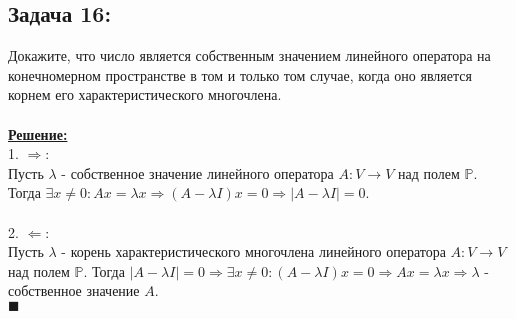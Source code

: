 \documentclass[a4paper,12pt,titlepage,final]{article}
\begin{document}
\subsection*{Задача 16:}
\noindent Докажите, что число является собственным значением линейного оператора на конечномерном
пространстве в том и только том случае, когда оно является корнем его характеристического
многочлена. \\ \\
\textbf{\underline{Решение:}} \\
1. $\Rightarrow:$ \\
Пусть $\lambda$ - собственное значение линейного оператора $A: V \rightarrow V$ над полем $\mathbb{P}$.
Тогда $\exists x \neq 0: Ax = \lambda x \Rightarrow (A - \lambda I)x = 0 \Rightarrow |A - \lambda I| = 0$. \\ \\
2. $\Leftarrow:$ \\
Пусть $\lambda$ - корень характеристического многочлена линейного оператора $A: V \rightarrow V$ над полем $\mathbb{P}$.
Тогда $|A - \lambda I| = 0 \Rightarrow \exists x \neq 0: (A - \lambda I)x = 0 \Rightarrow Ax = \lambda x
\Rightarrow \lambda$ - собственное значение $A$. \\ $\blacksquare$ \\ \\ \\


\end{document}
